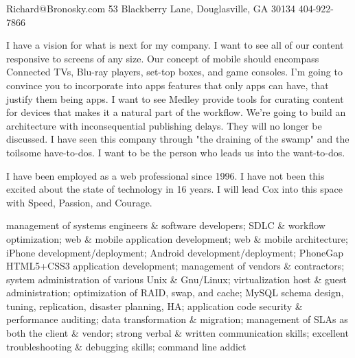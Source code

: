 \documentclass[10pt]{article}
\begin{document}
{Richard@Bronosky.com}
{53 Blackberry Lane, Douglasville, GA 30134}
{404-922-7866}

\begin{longtext}
    I have a vision for what is next for my company.
    I want to see all of our content responsive to screens of any size.
    Our concept of mobile should encompass Connected TVs, Blu-ray players, set-top boxes, and game consoles.
    I'm going to convince you to incorporate into apps features that only apps can have, that justify them being apps.
    I want to see Medley provide tools for curating content for devices that makes it a natural part of the workflow.
    We're going to build an architecture with inconsequential publishing delays. They will no longer be discussed.
    I have seen this company through "the draining of the swamp" and the toilsome have-to-dos. I want to be the person who leads us into the want-to-dos.
\end{longtext}
\shortspace
\begin{longtext}
    I have been employed as a web professional since 1996. I have not been this excited about the state of technology in 16 years. I will lead Cox into this space with Speed, Passion, and Courage.

\end{longtext}
\shortspace

\begin{longtext}
    management of systems engineers \& software developers;
    SDLC \& workflow optimization;
    web \& mobile application development;
    web \& mobile architecture;
    iPhone development/deployment;
    Android development/deployment;
    PhoneGap HTML5+CSS3 application development;
    management of vendors \& contractors;
    system administration of various Unix \& Gnu/Linux;
    virtualization host \& guest administration;
    optimization of RAID, swap, and cache;
    MySQL schema design, tuning, replication, disaster planning, HA;
    application code security \& performance auditing;
    data transformation \& migration;
    management of SLAs as both the client \& vendor;
    strong verbal \& written communication skills;
    excellent troubleshooting \& debugging skills;
    command line addict
\end{longtext}
\shortspace
\end{document}
